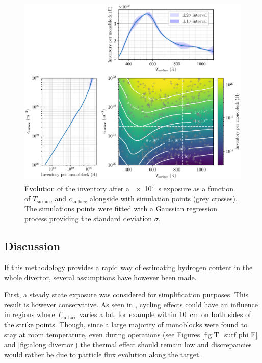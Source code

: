 \begin{figure} [h]
    \centering
    \includegraphics[width=\linewidth]{Figures/Chapter3/monoblocks/parametric_study/inventory_T_c_profiles.pdf}
    \caption{Evolution of the inventory after a \SI{e7}{s} exposure as a function of $T_\mathrm{surface}$ and $c_\mathrm{surface}$ alongside with simulation points (grey crosses). The simulations points were fitted with a Gaussian regression process \cite{chris_bowman_c-bowmaninference-tools_2020} providing the standard deviation $\sigma$.}
    \label{fig:inventory T c}
\end{figure}

\subsection{Discussion}
If this methodology provides a rapid way of estimating hydrogen content in the whole divertor, several assumptions have however been made.


First, a steady state exposure was considered for simplification purposes.
This result is however conservative.
As seen in , cycling effects could have an influence in regions where $T_\mathrm{surface}$ varies a lot, for example \textcolor{black}{within \SI{10}{cm} on both sides of the strike points}.
Though, since a large majority of monoblocks were found to stay at room temperature, even during operations (see Figures \ref{fig:T_surf phi E} and \ref{fig:along divertor}) the thermal effect should remain low and discrepancies would rather be due to particle flux evolution along the target.

